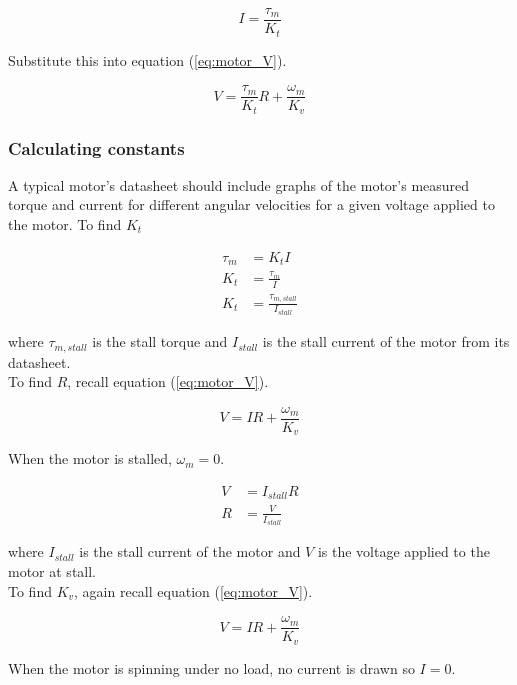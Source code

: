 \begin{equation*}
  I = \frac{\tau_m}{K_t}
\end{equation*}

Substitute this into equation (\ref{eq:motor_V}).

\begin{equation}
  V = \frac{\tau_m}{K_t} R + \frac{\omega_m}{K_v} \label{eq:motor_tau_V}
\end{equation}

\subsubsection{Calculating constants}

A typical motor's datasheet should include graphs of the motor's measured torque
and current for different angular velocities for a given voltage applied to the
motor. To find $K_t$

\begin{align}
  \tau_m &= K_t I \nonumber \\
  K_t &= \frac{\tau_m}{I} \nonumber \\
  K_t &= \frac{\tau_{m,stall}}{I_{stall}}
\end{align}

where $\tau_{m,stall}$ is the stall torque and $I_{stall}$ is the stall current
of the motor from its datasheet. \\

To find $R$, recall equation (\ref{eq:motor_V}).

\begin{equation*}
  V = IR + \frac{\omega_m}{K_v}
\end{equation*}

When the motor is stalled, $\omega_m = 0$.

\begin{align}
  V &= I_{stall} R \nonumber \\
  R &= \frac{V}{I_{stall}}
\end{align}

where $I_{stall}$ is the stall current of the motor and $V$ is the voltage
applied to the motor at stall. \\

To find $K_v$, again recall equation (\ref{eq:motor_V}).

\begin{equation*}
  V = IR + \frac{\omega_m}{K_v}
\end{equation*}

When the motor is spinning under no load, no current is drawn so $I = 0$.

